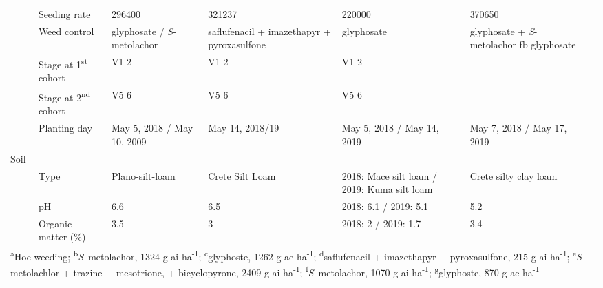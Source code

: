 \begin{table}[!h]
{\begin{tabular}[t]{lllllll}
 & Seeding rate & 296400 & 321237 & 220000 & 370650 & \\

 & Weed control & glyphosate / \emph{S}-metolachor & saflufenacil + imazethapyr + pyroxasulfone & glyphosate & glyphosate + \emph{S}-metolachor fb glyphosate & \\

 & Stage at 1\textsuperscript{st} cohort & V1-2 & V1-2 & V1-2 &  & \\

 & Stage at 2\textsuperscript{nd} cohort & V5-6 & V5-6 & V5-6 &  & \\

\multirow{-6}{*}{\raggedright\arraybackslash } & Planting day & May 5, 2018 / May 10, 2009 & May 14, 2018/19 & May 5, 2018 / May 14, 2019 & May 7, 2018 / May 17, 2019 & \\

Soil &  &  &  &  &  & \\

 & Type & Plano-silt-loam & Crete Silt Loam & 2018: Mace silt loam / 2019: Kuma silt loam & Crete silty clay loam & \\

 & pH & 6.6 & 6.5 & 2018: 6.1 / 2019: 5.1 & 5.2 & \\

\multirow{-4}{*}{\raggedright\arraybackslash } & Organic matter (\%) & 3.5 & 3 & 2018: 2 / 2019: 1.7 & 3.4 & \\
\bottomrule
\multicolumn{7}{l}{\rule{0pt}{1em}\textsuperscript{a}Hoe weeding; \textsuperscript{b}\emph{S}--metolachor, 1324 g ai ha\textsuperscript{-1}; \textsuperscript{c}glyphoste, 1262 g ae ha\textsuperscript{-1}; \textsuperscript{d}saflufenacil + imazethapyr + pyroxasulfone, 215 g ai ha\textsuperscript{-1}; \textsuperscript{e}\emph{S}-metolachlor + trazine + mesotrione, + bicyclopyrone, 2409 g ai ha\textsuperscript{-1}; \textsuperscript{f}\emph{S}--metolachor, 1070 g ai ha\textsuperscript{-1}; \textsuperscript{g}glyphoste, 870 g ae ha\textsuperscript{-1}} \\
\end{tabular}}
\end{table}





